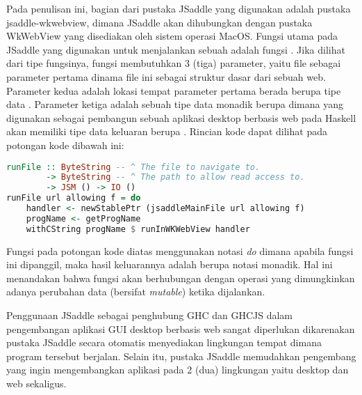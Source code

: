 \documentclass[pi.tex]{subfile}
\begin{document}
\hspace{5pt}Pada penulisan ini, bagian dari pustaka JSaddle yang digunakan adalah pustaka jsaddle-wkwebview, dimana JSaddle akan dihubungkan dengan pustaka WkWebView yang disediakan oleh sistem operasi MacOS. Fungsi utama pada JSaddle yang digunakan untuk menjalankan sebuah  adalah fungsi . Jika dilihat dari tipe fungsinya, fungsi  membutuhkan 3 (tiga) parameter, yaitu file  sebagai parameter pertama dinama file ini sebagai struktur dasar dari sebuah web. Parameter kedua adalah lokasi tempat parameter pertama berada berupa tipe data . Parameter ketiga adalah sebuah tipe data monadik berupa  dimana  yang digunakan sebagai pembangun sebuah aplikasi desktop berbasis web pada Haskell akan memiliki tipe data keluaran berupa . Rincian kode  dapat dilihat pada potongan kode dibawah ini:\\

\begin{lstlisting}[language=Haskell]
runFile :: ByteString -- ^ The file to navigate to.
        -> ByteString -- ^ The path to allow read access to.
        -> JSM () -> IO ()
runFile url allowing f = do
    handler <- newStablePtr (jsaddleMainFile url allowing f)
    progName <- getProgName
    withCString progName $ runInWKWebView handler
\end{lstlisting}

\hspace{5pt}Fungsi  pada potongan kode diatas menggunakan notasi \emph{do} dimana apabila fungsi ini dipanggil, maka hasil keluarannya adalah berupa notasi monadik. Hal ini menandakan bahwa fungsi  akan berhubungan dengan operasi yang dimungkinkan adanya perubahan data (bersifat \emph{mutable}) ketika dijalankan.

\hspace{5pt}Penggunaan JSaddle sebagai penghubung GHC dan GHCJS dalam pengembangan aplikasi GUI desktop berbasis web sangat diperlukan dikarenakan pustaka JSaddle secara otomatis menyediakan lingkungan tempat dimana program tersebut berjalan. Selain itu, pustaka JSaddle memudahkan pengembang yang ingin mengembangkan aplikasi pada 2 (dua) lingkungan yaitu desktop dan web sekaligus.
\end{document}
